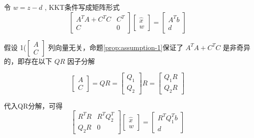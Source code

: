 令 $ w=z-d $ , KKT条件写成矩阵形式
\begin{equation}
\left[\begin{array}{cc}
A^{T} A+C^{T} C & C^{T} \\
C & 0
\end{array}\right]\left[\begin{array}{l}
\hat{x} \\
w
\end{array}\right]=\left[\begin{array}{c}
A^{T} b \\
d
\end{array}\right]
\end{equation}

假设 1($ \left[\begin{array}{l}A \\ C\end{array}\right] $ 列向量无关，命题\ref{prop:assumption-1}保证了 $ A^{T} A+C^{T} C $ 是非奇异的，即存在以下 $ Q R $ 因子分解

\begin{equation} \left[\begin{array}{l}A \\ C\end{array}\right]=Q R=\left[\begin{array}{l}Q_{1} \\ Q_{2}\end{array}\right] R=\left[\begin{array}{l}Q_{1} R \\ Q_{2} R\end{array}\right] \end{equation}

代入QR分解，可得
\begin{equation}
\left[\begin{array}{cc}
R^{T} R & R^{T} Q_{2}^{T} \\
Q_{2} R & 0
\end{array}\right]\left[\begin{array}{c}
\hat{x} \\
w
\end{array}\right]=\left[\begin{array}{c}
R^{T} Q_{1}^{T} b \\
d
\end{array}\right]
\end{equation}

